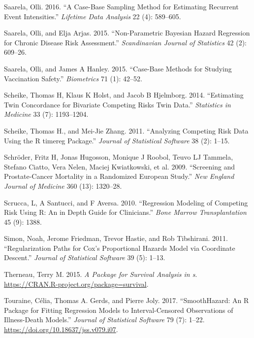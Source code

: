 \begin{CSLReferences}{1}{0}
\leavevmode{}%
Saarela, Olli. 2016. {``A Case-Base Sampling Method for Estimating Recurrent Event Intensities.''} \emph{Lifetime Data Analysis} 22 (4): 589--605.

\leavevmode{}%
Saarela, Olli, and Elja Arjas. 2015. {``Non-Parametric {B}ayesian Hazard Regression for Chronic Disease Risk Assessment.''} \emph{Scandinavian Journal of Statistics} 42 (2): 609--26.

\leavevmode{}%
Saarela, Olli, and James A Hanley. 2015. {``Case-Base Methods for Studying Vaccination Safety.''} \emph{Biometrics} 71 (1): 42--52.

\leavevmode{}%
Scheike, Thomas H, Klaus K Holst, and Jacob B Hjelmborg. 2014. {``Estimating Twin Concordance for Bivariate Competing Risks Twin Data.''} \emph{Statistics in Medicine} 33 (7): 1193--1204.

\leavevmode{}%
Scheike, Thomas H., and Mei-Jie Zhang. 2011. {``Analyzing Competing Risk Data Using the {R} {timereg} Package.''} \emph{Journal of Statistical Software} 38 (2): 1--15.

\leavevmode{}%
Schröder, Fritz H, Jonas Hugosson, Monique J Roobol, Teuvo LJ Tammela, Stefano Ciatto, Vera Nelen, Maciej Kwiatkowski, et al. 2009. {``Screening and Prostate-Cancer Mortality in a Randomized {E}uropean Study.''} \emph{New England Journal of Medicine} 360 (13): 1320--28.

\leavevmode{}%
Scrucca, L, A Santucci, and F Aversa. 2010. {``Regression Modeling of Competing Risk Using {R}: An in Depth Guide for Clinicians.''} \emph{Bone Marrow Transplantation} 45 (9): 1388.

\leavevmode{}%
Simon, Noah, Jerome Friedman, Trevor Hastie, and Rob Tibshirani. 2011. {``Regularization Paths for {C}ox's Proportional Hazards Model via Coordinate Descent.''} \emph{Journal of Statistical Software} 39 (5): 1--13.

\leavevmode{}%
Therneau, Terry M. 2015. \emph{A Package for Survival Analysis in s}. \url{https://CRAN.R-project.org/package=survival}.

\leavevmode{}%
Touraine, Célia, Thomas A. Gerds, and Pierre Joly. 2017. {``{SmoothHazard}: An {R} Package for Fitting Regression Models to Interval-Censored Observations of Illness-Death Models.''} \emph{Journal of Statistical Software} 79 (7): 1--22. \url{https://doi.org/10.18637/jss.v079.i07}.


\end{CSLReferences}
